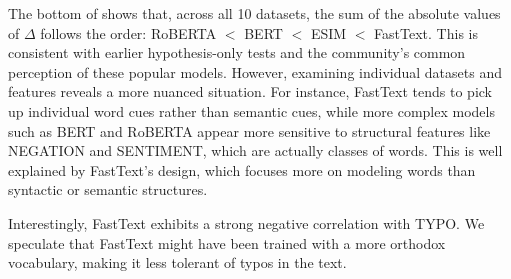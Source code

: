 The bottom of  shows that, 
across all 10 datasets, the sum of the absolute 
values of $\Delta$ follows the order: RoBERTA $<$ BERT $<$ ESIM $<$ FastText. This is consistent with earlier hypothesis-only tests and the community's common perception of these popular models. However, examining individual datasets and features reveals a more nuanced situation. For instance, FastText tends to pick up individual word cues rather than semantic cues, while more complex models such as BERT and RoBERTA appear more sensitive to structural features like NEGATION and SENTIMENT, which are actually classes of words. This is well explained by FastText's design, which focuses more on modeling words than syntactic or semantic structures.

Interestingly, FastText exhibits a strong negative correlation with TYPO. We speculate that FastText might have been trained with a more orthodox vocabulary, making it less tolerant of typos in the text.

